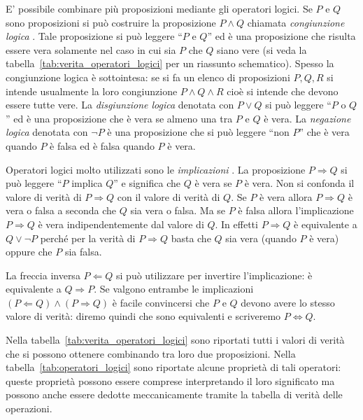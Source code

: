 E' possibile combinare più proposizioni mediante
gli operatori logici. Se $P$ e $Q$ sono proposizioni
si può costruire la proposizione $P \land Q$
chiamata \emph{congiunzione logica}%
%
.
Tale proposizione
si può leggere ``$P$ e $Q$'' ed è una proposizione
che risulta essere vera solamente nel caso in cui sia
$P$ che $Q$ siano vere
(si veda la tabella~\ref{tab:verita_operatori_logici}
per un riassunto schematico).
Spesso la congiunzione logica è sottointesa:
se si fa un elenco di proposizioni $P,Q,R$ 
si intende usualmente la loro congiunzione $P \land Q \land R$
cioè si intende che devono essere tutte vere.
La \emph{disgiunzione logica}%
%
 denotata
con $P \lor Q$
si può leggere ``$P$ o $Q$'' ed è una proposizione che
è vera se almeno una tra $P$ e $Q$ è vera.
La \emph{negazione logica}%
%
 denotata con $\lnot P$ è una
proposizione che si può leggere ``non $P$'' che
è vera quando $P$ è falsa ed è falsa quando $P$ è vera.

Operatori logici molto utilizzati sono le \emph{implicazioni}%
%
.
La proposizione $P\Rightarrow Q$ si può leggere ``$P$ implica $Q$''
e significa che $Q$ è vera se $P$ è vera. Non si confonda
il valore di verità di $P\Rightarrow Q$ con il valore di verità
di $Q$. Se $P$ è vera allora $P\Rightarrow Q$ è vera o falsa
a seconda che $Q$ sia vera o falsa. Ma se $P$ è falsa allora
l'implicazione $P\Rightarrow Q$ è vera indipendentemente dal
valore di $Q$. In effetti $P\Rightarrow Q$ è equivalente a
$Q \lor \lnot P$ perché per la verità di $P\Rightarrow Q$
basta che $Q$ sia vera (quando $P$ è vera) oppure che $P$ sia falsa.

La freccia inversa $P\Leftarrow Q$ si può utilizzare per
invertire l'implicazione: è equivalente a $Q \Rightarrow P$.
Se valgono entrambe le implicazioni
$(P \Leftarrow Q) \land (P\Rightarrow Q)$
è facile convincersi che $P$ e $Q$ devono avere lo stesso
valore di verità: diremo quindi che sono equivalenti e
scriveremo $P \Leftrightarrow Q$.

Nella tabella~\ref{tab:verita_operatori_logici} sono riportati
tutti i valori di verità che si possono ottenere combinando
tra loro due proposizioni. Nella tabella~\ref{tab:operatori_logici}
sono riportate alcune proprietà di tali operatori: queste
proprietà possono essere comprese interpretando il loro significato
ma possono anche essere dedotte meccanicamente tramite la tabella
di verità delle operazioni.

